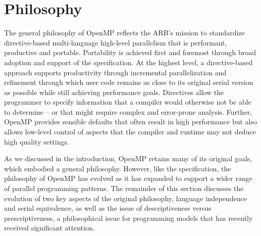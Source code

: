 \section{Philosophy}
\label{sec:philosophy}

The general philosophy of OpenMP reflects the ARB's mission to standardize 
directive-based multi-language high-level parallelism that is performant, 
productive and portable. Portability is achieved first and foremost through
broad adoption and support of the specification. At the highest level, a 
directive-based approach supports productivity through incremental 
parallelization and refinement through which user code remains as close 
to its original serial version as possible while still achieving performance 
goals. Directives allow the programmer to specify information that a compiler
would otherwise not be able to determine -- or that might require complex
and error-prone analysis. Further, OpenMP provides sensible defaults that 
often result in high performance but also allows low-level control of 
aspects that the compiler and runtime may not deduce high quality settings.

As we discussed in the introduction, OpenMP retains many of its original
goals, which embodied a general philosophy. However, like the specification, 
the philosophy of OpenMP has evolved as it has expanded to support a wider
range of parallel programming patterns. The remainder of this section 
discusses the evolution of two key aspects of the original philosophy,
language independence and serial equivalence, as well as the issue of
descriptiveness versus prescriptiveness, a philosophical issue for 
programming models that has recently received significant attention.




